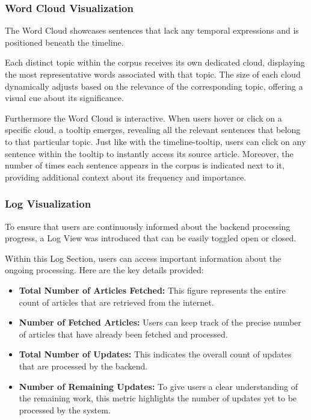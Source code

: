 \documentclass[a4paper,12pt]{report} %
\begin{document}
\subsubsection{Word Cloud Visualization}
The Word Cloud showcases sentences that lack any temporal expressions and is positioned beneath the timeline.

Each distinct topic within the corpus receives its own dedicated cloud, displaying the most representative words associated with that topic. The size of each cloud dynamically adjusts based on the relevance of the corresponding topic, offering a visual cue about its significance.

Furthermore the Word Cloud is interactive. When users hover or click on a specific cloud, a tooltip emerges, revealing all the relevant sentences that belong to that particular topic. Just like with the timeline-tooltip, users can click on any sentence within the tooltip to instantly access its source article. Moreover, the number of times each sentence appears in the corpus is indicated next to it, providing additional context about its frequency and importance.

\subsubsection{Log Visualization}
To ensure that users are continuously informed about the backend processing progress, a Log View was introduced that can be easily toggled open or closed.

Within this Log Section, users can access important information about the ongoing processing. Here are the key details provided:

\begin{itemize}
  \item \textbf{Total Number of Articles Fetched:} This figure represents the entire count of articles that are retrieved from the internet.

  \item \textbf{Number of Fetched Articles:} Users can keep track of the precise number of articles that have already been fetched and processed.

  \item \textbf{Total Number of Updates:} This indicates the overall count of updates that are processed by the backend.

  \item \textbf{Number of Remaining Updates:} To give users a clear understanding of the remaining work, this metric highlights the number of updates yet to be processed by the system.
\end{itemize}
\end{document}
